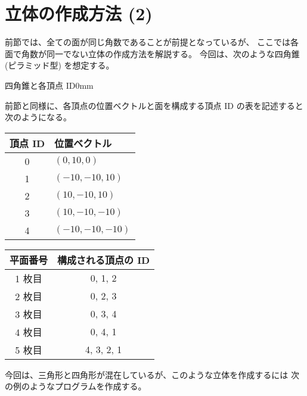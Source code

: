 \section{立体の作成方法 (2)} \label{sec:solidGen2}
前節では、全ての面が同じ角数であることが前提となっているが、
ここでは各面で角数が同一でない立体の作成方法を解説する。
今回は、次のような四角錐 (ピラミッド型) を想定する。

	{四角錐と各頂点 ID}{0mm}

前節と同様に、各頂点の位置ベクトルと面を構成する頂点 ID の表を記述すると
次のようになる。
\begin{center}
\begin{tabular}{|c|l|}
\hline
頂点 ID & 位置ベクトル \\ \hline
0 & \((0, 10, 0)\) \\ \hline
1 & \((-10, -10, 10)\) \\ \hline
2 & \((10, -10, 10)\) \\ \hline
3 & \((10, -10, -10)\) \\ \hline
4 & \((-10, -10, -10)\) \\ \hline
\end{tabular} \qquad
\begin{tabular}{|c|c|}
\hline
平面番号 & 構成される頂点の ID \\ \hline
1 枚目 & 0, 1, 2 \\ \hline
2 枚目 & 0, 2, 3 \\ \hline
3 枚目 & 0, 3, 4 \\ \hline
4 枚目 & 0, 4, 1 \\ \hline
5 枚目 & 4, 3, 2, 1 \\ \hline
\end{tabular}
\end{center}
今回は、三角形と四角形が混在しているが、このような立体を作成するには
次の例のようなプログラムを作成する。
\\
